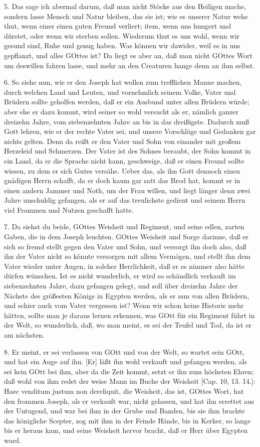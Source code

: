 5. Das sage ich abermal darum, daß man nicht Stöcke aus den Heiligen mache, sondern lasse Mensch und Natur bleiben, das sie ist; wie es unserer Natur wehe thut, wenn einer einen guten Freund verliert; item, wenn uns hungert und dürstet, oder wenn wir sterben sollen. Wiederum
thut es uns wohl, wenn wir gesund sind, Ruhe und genug haben. Was können wir dawider, weil es in uns gepflanzt, und alles GOttes ist? Da liegt es aber an, daß man nicht GOttes Wort um deswillen fahren lasse, und mehr an den Creaturen hange denn an ihm selbst.

6. So siehe nun, wie er den Joseph hat wollen zum trefflichen Manne machen, durch welchen Land und Leuten, und vornehmlich seinem Volke, Vater und Brüdern sollte geholfen werden, daß er ein Ausbund unter allen Brüdern würde; aber ehe er dazu kommt, wird seiner so wohl versucht als er, nämlich ganzer dreizehn Jahre, vom siebenzehnten Jahre an bis in das dreißigste. Dadurch muß Gott lehren, wie er der rechte Vater sei, und unsere Vorschläge und Gedanken gar nichts gelten. Denn da reißt er den Vater und Sohn von einander mit großem Herzeleid und Schmerzen. Der Vater ist des Sohnes beraubt, der Sohn kommt in ein Land, da er die Sprache nicht kann, geschweige, daß er einen Freund sollte wissen, zu dem er sich Gutes versähe. Ueber das, als ihn Gott dennoch einen gnädigen Herrn schafft, da er doch kaum gar satt das Brod hat, kommt er in einen andern Jammer und Noth, um der Frau willen, und liegt länger denn zwei Jahre unschuldig gefangen, als er auf das treulichste gedient und seinem Herrn viel Frommen und Nutzen geschafft hatte.

7. Da siehst du beide, GOttes Weisheit und Regiment, und seine edlen, zarten Gaben, die in dem Joseph leuchten. GOttes Weisheit und Sorge darinne, daß er sich so fremd stellt gegen den Vater und Sohn, und versorgt ihn doch also, daß ihn der Vater nicht so könnte versorgen mit allem Vermögen, und stellt ihn dem Vater wieder unter Augen, in solcher Herrlichkeit, daß er es nimmer also hätte dürfen wünschen. Ist es nicht wunderlich, er wird so schändlich verkauft im siebenzehnten Jahre, dazu gefangen gelegt, und soll über dreizehn Jahre der Nächste des größesten Königs in Egypten werden, als er nun von allen Brüdern, und schier auch vom Vater vergessen ist? Wenn wir schon keine Historie mehr hätten, sollte man je daraus lernen erkennen, was GOtt für ein Regiment führt in der Welt, so wunderlich, daß, wo man meint, es sei der Teufel und Tod, da ist er am nächsten.

8. Er meint, er sei verlassen von GOtt und von der Welt, so wartet sein GOtt, und hat ein Auge auf ihn. [Er] läßt ihn wohl verkauft und gefangen werden, als sei kein GOtt bei ihm, aber da die Zeit kommt, setzt er ihn zum höchsten Ehren; daß wohl von ihm redet der weise Mann im Buche der Weisheit [Cap. 10, 13. 14.]: Haec venditum justum non dereliquit, die Weisheit, das ist, GOttes Wort, hat den frommen Joseph, als er verkauft war, nicht gelassen, und hat ihn errettet aus der Untugend, und war bei ihm in der Grube und Banden, bis sie ihm brachte das königliche Scepter, zog mit ihm in der Feinde Hände, bis in Kerker, so lange bis er heraus kam, und seine Weisheit hervor bracht, daß er Herr über Egypten ward.

